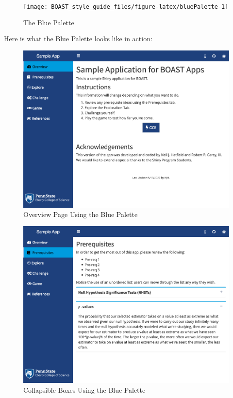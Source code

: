 \documentclass[]{book}
\begin{document}
\begin{figure}

{\centering \texttt{[image: BOAST\_style\_guide\_files/figure-latex/bluePalette-1]} 

}

\caption{The Blue Palette}\label{fig:bluePalette}
\end{figure}

Here is what the Blue Palette looks like in action:

\begin{figure}

{\centering \includegraphics[width=13.26in]{images/blueOverview} 

}

\caption{Overview Page Using the Blue Palette}\label{fig:blueAction1}
\end{figure}

\begin{figure}

{\centering \includegraphics[width=13.26in]{images/blueCollapse} 

}

\caption{Collapsible Boxes Using the Blue Palette}\label{fig:blueAction2}
\end{figure}
\end{document}
